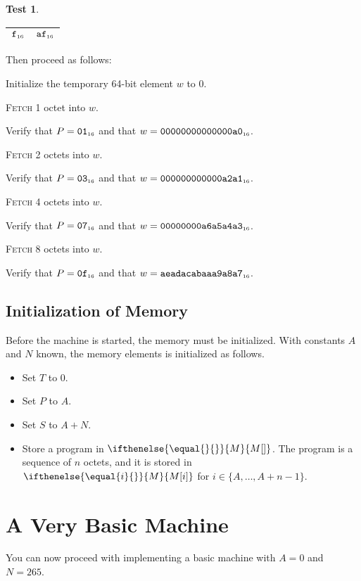 \documentclass[a4paper,12pt]{article}
\makeatletter
\newcommand{\num}[1]{\texttt{\MakeLowercase{#1}}}
\newcommand{\hex}[1]{\num{#1}_{\textup{\tiny 16}}}
\newcommand{\MEM}[1]{\ifthenelse{\equal{#1}{}}{M}{M[#1]}}
\newcommand{\PC}{P}
\newcommand{\SP}{S}
\newcommand{\TERM}{T}
\newcommand{\range}[2]{\{#1,\ldots,#2\}}
\newcommand{\proc}[1]{\textsc{#1}}
\theoremstyle{definition}
\newtheorem{test}{Test}
\newenvironment{memtable}{%
  \begin{trivlist}
    \item
    }{%
    \end{trivlist}}
\newenvironment{memcolumn}{%
  \begin{tabular}{@{}ll@{}}
    \hline}
    {%
    \hline
  \end{tabular}}
\makeatother
\begin{document}
\begin{test}
\begin{memtable}
\begin{memcolumn}
      $\hex{F}$ & $\hex{AF}$ \\
    \end{memcolumn}
  \end{memtable}
  Then proceed as follows:
  \begin{stepnumbers}
  \item Initialize the temporary 64-bit element $w$ to 0.
  \item \proc{Fetch} 1 octet into $w$.
  \item Verify that $\PC = \hex{01}$ and that $w = \hex{00000000000000A0}$.
  \item \proc{Fetch} 2 octets into $w$.
  \item Verify that $\PC = \hex{03}$ and that $w = \hex{000000000000A2A1}$.
  \item \proc{Fetch} 4 octets into $w$.
  \item Verify that $\PC = \hex{07}$ and that $w = \hex{00000000A6A5A4A3}$.
  \item \proc{Fetch} 8 octets into $w$.
  \item Verify that $\PC = \hex{0F}$ and that $w = \hex{AEADACABAAA9A8A7}$.
  \end{stepnumbers}
\end{test}

\subsection{Initialization of Memory}
\label{sec:initialization-of-memory}

Before the machine is started, the memory must be initialized.
With constants $A$ and $N$ known, the memory elements is initialized as follows.
\begin{itemize}
\item Set $\TERM$ to 0.
\item Set $\PC$ to $A$.
\item Set $\SP$ to $A+N$.
\item Store a program in $\MEM{}$.
  The program is a sequence of $n$ octets, and it is stored in $\MEM{i}$ for $i \in \range{A}{A+n-1}$.
\end{itemize}

\section{A Very Basic Machine}

You can now proceed with implementing a basic machine with $A=0$ and $N=265$.
\end{document}
